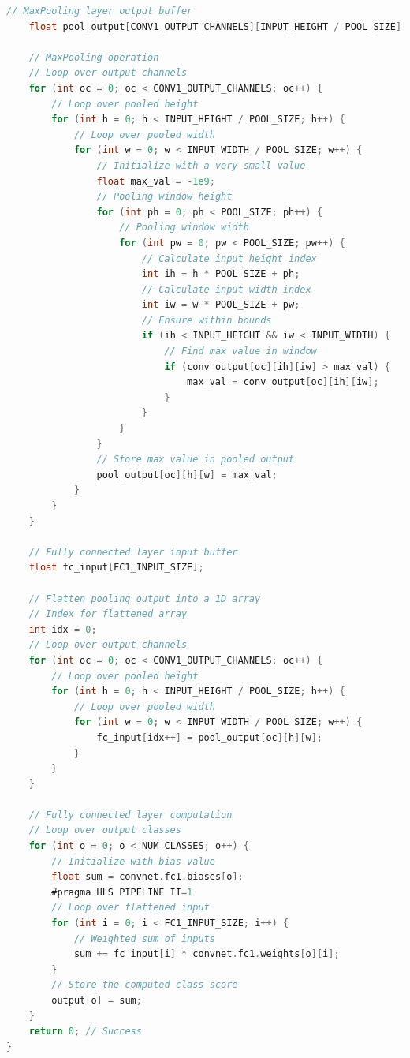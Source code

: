 \documentclass{article}
\begin{document}
\begin{lstlisting}[language=C]
    // MaxPooling layer output buffer
    float pool_output[CONV1_OUTPUT_CHANNELS][INPUT_HEIGHT / POOL_SIZE][INPUT_WIDTH / POOL_SIZE];

    // MaxPooling operation
    // Loop over output channels
    for (int oc = 0; oc < CONV1_OUTPUT_CHANNELS; oc++) { 
        // Loop over pooled height
        for (int h = 0; h < INPUT_HEIGHT / POOL_SIZE; h++) { 
            // Loop over pooled width
            for (int w = 0; w < INPUT_WIDTH / POOL_SIZE; w++) { 
                // Initialize with a very small value
                float max_val = -1e9; 
                // Pooling window height
                for (int ph = 0; ph < POOL_SIZE; ph++) { 
                    // Pooling window width
                    for (int pw = 0; pw < POOL_SIZE; pw++) { 
                        // Calculate input height index
                        int ih = h * POOL_SIZE + ph; 
                        // Calculate input width index
                        int iw = w * POOL_SIZE + pw; 
                        // Ensure within bounds
                        if (ih < INPUT_HEIGHT && iw < INPUT_WIDTH) { 
                            // Find max value in window
                            if (conv_output[oc][ih][iw] > max_val) { 
                                max_val = conv_output[oc][ih][iw];
                            }
                        }
                    }
                }
                // Store max value in pooled output
                pool_output[oc][h][w] = max_val; 
            }
        }
    }

    // Fully connected layer input buffer
    float fc_input[FC1_INPUT_SIZE];

    // Flatten pooling output into a 1D array
    // Index for flattened array
    int idx = 0; 
    // Loop over output channels
    for (int oc = 0; oc < CONV1_OUTPUT_CHANNELS; oc++) { 
        // Loop over pooled height
        for (int h = 0; h < INPUT_HEIGHT / POOL_SIZE; h++) { 
            // Loop over pooled width
            for (int w = 0; w < INPUT_WIDTH / POOL_SIZE; w++) { 
                fc_input[idx++] = pool_output[oc][h][w];
            }
        }
    }

    // Fully connected layer computation
    // Loop over output classes
    for (int o = 0; o < NUM_CLASSES; o++) { 
        // Initialize with bias value
        float sum = convnet.fc1.biases[o]; 
        #pragma HLS PIPELINE II=1
        // Loop over flattened input
        for (int i = 0; i < FC1_INPUT_SIZE; i++) { 
            // Weighted sum of inputs
            sum += fc_input[i] * convnet.fc1.weights[o][i]; 
        }
        // Store the computed class score
        output[o] = sum; 
    }
    return 0; // Success
}
       
\end{lstlisting}
\end{document}
